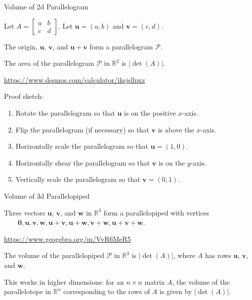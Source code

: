\documentclass[xcolor=dvipsnames,aspectratio=169,t]{beamer}
\begin{document}
\begin{frame}{Volume of 2d Parallelogram}
\bigskip
  
  Let $A=\begin{bmatrix} a & b \\ c & d \end{bmatrix}$.  Let $\mathbf{u}=(a,b)$ and $\mathbf{v}=(c,d)$.
  \medskip
  
  The origin, $\mathbf{u}$, $\mathbf{v}$, and $\mathbf{u}+\mathbf{v}$ form a \alert{parallelogram $\mathcal{P}$}.
  
  \pause
  \begin{theorem}
    The area of the parallelogram $\mathcal{P}$ in $\mathbb{R}^2$ is $|\det(A)|$.
  \end{theorem}

  \url{https://www.desmos.com/calculator/iksjsllpxz}
  
  \pause
  Proof sketch:
  \begin{enumerate}
    \item Rotate the parallelogram so that $\mathbf{u}$ is on the positive $x$-axis.
    \item Flip the parallelogram (if necessary) so that $\mathbf{v}$ is above the $x$-axis.
    \item Horizontally scale the parallelogram so that $\mathbf{u}=(1,0)$.
    \item Horizontally shear the parallelogram so that $\mathbf{v}$ is on the $y$-axis.
    \item Vertically scale the parallelogram so that $\mathbf{v}=(0,1)$.
  \end{enumerate}
\end{frame}

\begin{frame}{Volume of 3d Parallelopiped}
\medskip

  Three vectors $\mathbf{u}$, $\mathbf{v}$, and $\mathbf{w}$ in $\mathbb{R}^3$ form a \alert{parallelopiped} with vertices \\
  $\qquad \mathbf{0},
  \mathbf{u},\mathbf{v},\mathbf{w},
  \mathbf{u}+\mathbf{v},\mathbf{u}+\mathbf{w},\mathbf{v}+\mathbf{w},
  \mathbf{u}+\mathbf{v}+\mathbf{w}$.
  \bigskip

  \url{https://www.geogebra.org/m/VvR6MeR5}
  \bigskip
  
  \pause
  \begin{theorem}
    The volume of the parallelopiped $\mathcal{P}$ in $\mathbb{R}^3$ is $|\det(A)|$, where $A$ has rows $\mathbf{u}$, $\mathbf{v}$, and $\mathbf{w}$.
  \end{theorem}
  \bigskip
  
  This works in higher dimensions: for an $n\times n$ matrix $A$, the volume of the \alert{parallelotope} in $\mathbb{R}^n$ corresponding to the rows of $A$ is given by $|\det(A)|$.
    
\end{frame}
\end{document}
